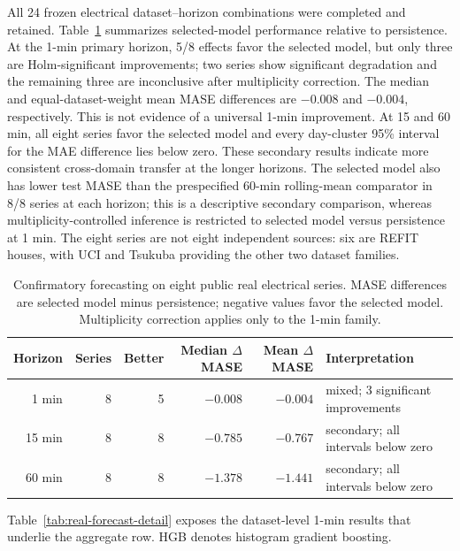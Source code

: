 All 24 frozen electrical dataset--horizon combinations were completed and
retained. Table~\ref{tab:real-forecast} summarizes selected-model performance
relative to persistence. At the 1-min primary horizon, 5/8 effects favor the
selected model, but only three are Holm-significant improvements; two series
show significant degradation and the remaining three are inconclusive after
multiplicity correction. The median and equal-dataset-weight mean MASE
differences are $-0.008$ and $-0.004$, respectively. This is not evidence of a
universal 1-min improvement. At 15 and 60 min, all eight series favor the
selected model and every day-cluster 95\% interval for the MAE difference lies
below zero. These secondary results indicate more consistent cross-domain
transfer at the longer horizons.
The selected model also has lower test MASE than the prespecified 60-min
rolling-mean comparator in 8/8 series at each horizon; this is a descriptive
secondary comparison, whereas multiplicity-controlled inference is restricted
to selected model versus persistence at 1 min. The eight series are not eight
independent sources: six are REFIT houses, with UCI and Tsukuba providing the
other two dataset families.

\begin{table}[!t]
\caption{Confirmatory forecasting on eight public real electrical series.
MASE differences are selected model minus persistence; negative values favor
the selected model. Multiplicity correction applies only to the 1-min family.}
\label{tab:real-forecast}
\centering
\footnotesize
\begin{tabular}{@{}rrrrrl@{}}
\toprule
Horizon & Series & Better & Median $\Delta$MASE & Mean $\Delta$MASE & Interpretation \\
\midrule
1 min & 8 & 5 & $-0.008$ & $-0.004$ & mixed; 3 significant improvements \\
15 min & 8 & 8 & $-0.785$ & $-0.767$ & secondary; all intervals below zero \\
60 min & 8 & 8 & $-1.378$ & $-1.441$ & secondary; all intervals below zero \\
\bottomrule
\end{tabular}
\end{table}

Table~\ref{tab:real-forecast-detail} exposes the dataset-level 1-min results
that underlie the aggregate row. HGB denotes histogram gradient boosting.

